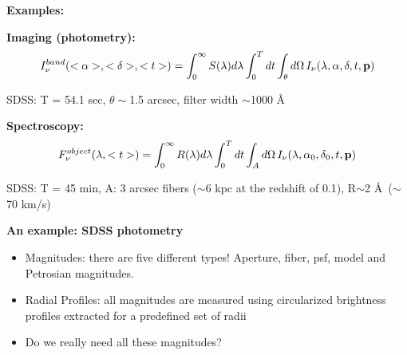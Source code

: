 \documentclass[letterpaper,landscape]{slides}
\begin{document}



\begin{slide}
\begin{center}
\bfseries
{\large {\color{red} Examples:}}
\end{center}

\vskip 0.6in

{\bf Imaging (photometry):}
\begin{equation}
  I_\nu^{band}(<\alpha>, <\delta>, <t>) = \int_{0}^{\infty} S(\lambda)d\lambda 
\int_{0}^T dt \int_{\theta}d\Omega  \, I_\nu (\lambda, \alpha, \delta, t, {\bf p}) 
\end{equation}

{\color{red} SDSS: \color{blue} T = 54.1 sec, $\theta \sim$1.5 arcsec, filter width $\sim$1000 \AA}

{\bf Spectroscopy:}
\begin{equation}
  F_{\nu}^{object}(\lambda, <t>) = \int_{0}^{\infty} R(\lambda)d\lambda 
\int_{0}^T dt \int_{A}d\Omega  \, I_\nu (\lambda, \alpha_0, \delta_0, t, {\bf p}) 
\end{equation}

{\color{red} SDSS: \color{blue} T = 45 min, A: 3 arcsec fibers ($\sim$6 kpc at the redshift of 0.1),
R$\sim$2 \AA \, ($\sim$70 km/s)}

\end{slide}
 






\begin{slide}
\begin{center}
\bfseries
{\large {\color{red} An example: SDSS photometry}}
\end{center}
\vskip 0.6in

\begin{itemize}
\item {\color{blue} Magnitudes:} there are five different types! Aperture,
         fiber, psf, model and Petrosian magnitudes.   
 \item {\color{blue} Radial Profiles:} all magnitudes are measured 
        using circularized brightness profiles extracted for a predefined 
        set of radii
\item {\color{red} Do we really need all these magnitudes?} 
\end{itemize}

\end{slide}
 
\end{document}
